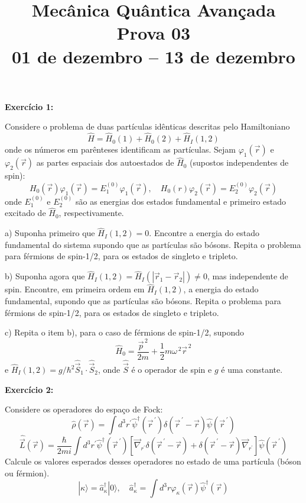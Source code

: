\documentclass[12pt]{article}
\title{Mecânica Quântica Avançada\\%
Prova 03\\%
01 de dezembro -- 13 de dezembro}
\date{}
\begin{document}
\maketitle
\vspace*{-4em}

\textbf{Exercício 1:} 

Considere o problema de duas partículas idênticas descritas pelo Hamiltoniano
\[
\hat{H}=\hat{H}_{0}(1)+\hat{H}_{0}(2)+\hat{H}_{I}(1,2)
\]
onde os números em parênteses identificam as partículas.
Sejam $\varphi_1(\vec{r})$ e  $\varphi_2(\vec{r})$ as partes espaciais dos autoestados de $\hat{H}_{0}$
(supostos independentes de spin):
\[
H_{0}(\vec{r}) \varphi_{1}(\vec{r})=E_{1}^{(0)} \varphi_{1}(\vec{r}), \quad H_{0}(r) \varphi_{2}(\vec{r})=E_{2}^{(0)} \varphi_{2}(\vec{r})
\]
onde $E_{1}^{(0)}$ e $E_{2}^{(0)}$ são as energias dos estados fundamental e primeiro estado excitado de
$\hat{H}_{0}$, respectivamente.

a) Suponha primeiro que $\hat{H}_{I}(1,2) = 0$. 
Encontre a energia do estado fundamental do sistema supondo que as partículas são bósons.
Repita o problema para férmions de spin-1/2, para os estados de singleto e tripleto.

b) Suponha agora que  $\hat{H}_{I}(1,2) =\hat{H}_{I}\left(\left|\vec{r}_{1}-\vec{r}_{2}\right|\right) \neq 0$, mas independente de spin.
Encontre, em primeira ordem em $\hat{H}_{I}(1,2)$, a energia do estado fundamental, supondo que as partículas são bósons.
Repita o problema para férmions de spin-1/2, para os estados de singleto e tripleto.

c) Repita o item b), para o caso de férmions de spin-1/2, supondo
\[
\hat{H}_{0}=\frac{\vec{p}^{\,2}}{2 m}+\frac{1}{2} m \omega^{\,2} \vec{r}^{\,2}
\]
e $\hat{H}_{I}(1,2)=g / \hbar^{2} \hat{\vec{S}}_{1} \cdot \hat{\vec{S}}_{2}$,
onde $\hat{\vec{S}}$ é o operador de spin e $g$ é uma constante.

\textbf{Exercício 2:} 

Considere os operadores do espaço de Fock:
\[
\hat{\rho}(\vec{r})=\int d^{3} r^{\prime} \hat{\psi}^{\dagger}\left(\vec{r}^{\,\prime}\right) \delta\left(\vec{r}^{\,\prime}-\vec{r}\right) \hat{\psi}\left(\vec{r}^{\,\prime}\right)
\]
\[
\hat{\vec{L}}(\vec{r})=\frac{\hbar}{2 m i} \int d^{3} r^{\prime} \hat{\psi}^{\dagger}\left(\vec{r}^{\,\prime}\right)\left[\vec{\nabla}_{r^{\prime}} \delta\left(\vec{r}^{\,\prime}-\vec{r}\right)+\delta\left(\vec{r}^{\,\prime}-\vec{r}\right) \vec{\nabla}_{r^{\prime}}\right] \hat{\psi}\left(\vec{r}^{\,\prime}\right)
\]
Calcule os valores esperados desses operadores no estado de uma partícula (bóson ou férmion).
\[
|\kappa\rangle=\hat{a}_{\kappa}^{\dagger}|0\rangle, \quad \hat{a}_{\kappa}^{\dagger}=\int d^{3} r \varphi_{\kappa}(\vec{r}) \hat{\psi}^{\dagger}(\vec{r})
\]
\end{document}
